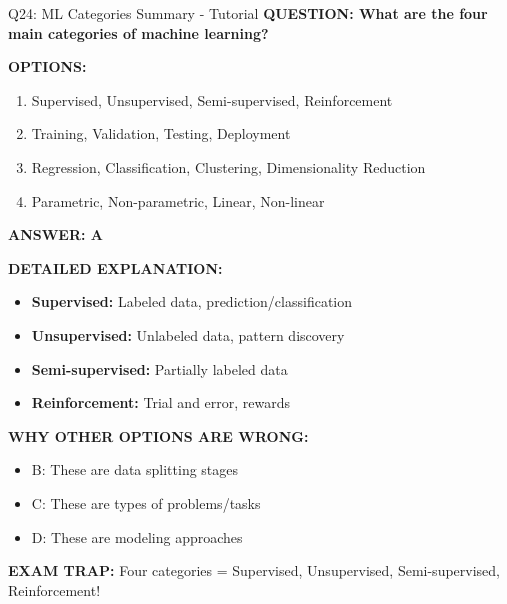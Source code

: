 \documentclass[8pt]{beamer}
\begin{document}
	\begin{frame}{Q24: ML Categories Summary - Tutorial}
		\fontsize{6.5}{7.5}\selectfont
		\textbf{QUESTION: What are the four main categories of machine learning?}
		
		\vspace{0.1cm}
		\textbf{OPTIONS:}
		\begin{enumerate}
			\item Supervised, Unsupervised, Semi-supervised, Reinforcement
			\item Training, Validation, Testing, Deployment
			\item Regression, Classification, Clustering, Dimensionality Reduction
			\item Parametric, Non-parametric, Linear, Non-linear
		\end{enumerate}
		
		\vspace{0.1cm}
		\textcolor{myblue}{\textbf{ANSWER: A}}
		
		\vspace{0.1cm}
		\textbf{DETAILED EXPLANATION:}
		\begin{itemize}
			\item \textbf{Supervised:} Labeled data, prediction/classification
			\item \textbf{Unsupervised:} Unlabeled data, pattern discovery
			\item \textbf{Semi-supervised:} Partially labeled data
			\item \textbf{Reinforcement:} Trial and error, rewards
		\end{itemize}
		
		\vspace{0.1cm}
		\textcolor{myred}{\textbf{WHY OTHER OPTIONS ARE WRONG:}}
		\begin{itemize}
			\item \textcolor{myred}{B:} These are data splitting stages
			\item \textcolor{myred}{C:} These are types of problems/tasks
			\item \textcolor{myred}{D:} These are modeling approaches
		\end{itemize}
		
		\textcolor{myred}{\textbf{EXAM TRAP:}} Four categories = \textcolor{myblue}{Supervised, Unsupervised, Semi-supervised, Reinforcement}!
	\end{frame}
	
\end{document}
